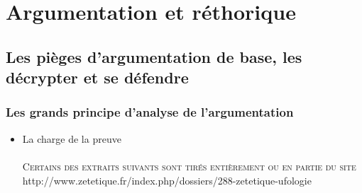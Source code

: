 \documentclass[a4paper,12pt]{article}
\begin{document}
\section{Argumentation et réthorique}
\subsection{Les pièges d'argumentation de base, les décrypter et se défendre}

\subsubsection {Les grands principe d'analyse de l'argumentation}

\begin{itemize}
 \item La charge de la preuve
 \paragraph{}
 {\scshape Certains des extraits suivants sont tirés entièrement ou en partie du site} http://www.zetetique.fr/index.php/dossiers/288-zetetique-ufologie

\end{itemize}
\end{document}
